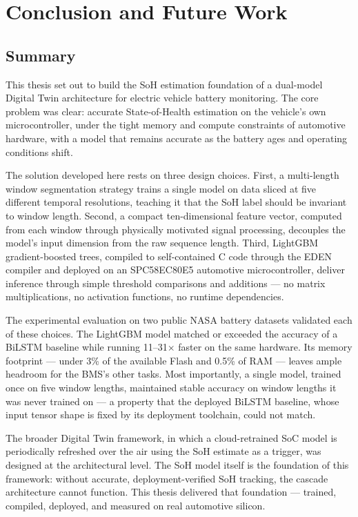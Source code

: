 \chapter{Conclusion and Future Work}
\label{conclusion}


\section{Summary}

This thesis set out to build the SoH estimation foundation of a dual-model Digital Twin architecture for electric vehicle battery monitoring. The core problem was clear: accurate State-of-Health estimation on the vehicle's own microcontroller, under the tight memory and compute constraints of automotive hardware, with a model that remains accurate as the battery ages and operating conditions shift.

The solution developed here rests on three design choices. First, a multi-length window segmentation strategy trains a single model on data sliced at five different temporal resolutions, teaching it that the SoH label should be invariant to window length. Second, a compact ten-dimensional feature vector, computed from each window through physically motivated signal processing, decouples the model's input dimension from the raw sequence length. Third, LightGBM gradient-boosted trees, compiled to self-contained C code through the EDEN compiler and deployed on an SPC58EC80E5 automotive microcontroller, deliver inference through simple threshold comparisons and additions --- no matrix multiplications, no activation functions, no runtime dependencies.

The experimental evaluation on two public NASA battery datasets validated each of these choices. The LightGBM model matched or exceeded the accuracy of a BiLSTM baseline while running 11--31$\times$ faster on the same hardware. Its memory footprint --- under 3\% of the available Flash and 0.5\% of RAM --- leaves ample headroom for the BMS's other tasks. Most importantly, a single model, trained once on five window lengths, maintained stable accuracy on window lengths it was never trained on --- a property that the deployed BiLSTM baseline, whose input tensor shape is fixed by its deployment toolchain, could not match.

The broader Digital Twin framework, in which a cloud-retrained SoC model is periodically refreshed over the air using the SoH estimate as a trigger, was designed at the architectural level. The SoH model itself is the foundation of this framework: without accurate, deployment-verified SoH tracking, the cascade architecture cannot function. This thesis delivered that foundation --- trained, compiled, deployed, and measured on real automotive silicon.

